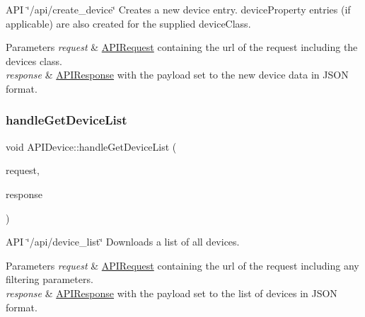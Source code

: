 A\+PI \char`\"{}/api/create\+\_\+device\char`\"{} Creates a new device entry. device\+Property entries (if applicable) are also created for the supplied device\+Class. 
\begin{DoxyParams}{Parameters}
{\em request} & \hyperlink{class_a_p_i_request}{A\+P\+I\+Request} containing the url of the request including the device\textquotesingle{}s class. \\
\hline
{\em response} & \hyperlink{class_a_p_i_response}{A\+P\+I\+Response} with the payload set to the new device data in J\+S\+ON format. \\
\hline
\end{DoxyParams}
\mbox{\label{class_a_p_i_device_a1e74a10d605557654fe5be02a9db87ab}} 
\subsubsection{\texorpdfstring{handle\+Get\+Device\+List}{handleGetDeviceList}}
{\footnotesize\ttfamily void A\+P\+I\+Device\+::handle\+Get\+Device\+List (\begin{DoxyParamCaption}\item[{const \hyperlink{class_a_p_i_request}{A\+P\+I\+Request} \&}]{request,  }\item[{\hyperlink{class_a_p_i_response}{A\+P\+I\+Response} $\ast$}]{response }\end{DoxyParamCaption})\hspace{0.3cm}{\ttfamily [slot]}}

A\+PI \char`\"{}/api/device\+\_\+list\char`\"{} Downloads a list of all devices. 
\begin{DoxyParams}{Parameters}
{\em request} & \hyperlink{class_a_p_i_request}{A\+P\+I\+Request} containing the url of the request including any filtering parameters. \\
\hline
{\em response} & \hyperlink{class_a_p_i_response}{A\+P\+I\+Response} with the payload set to the list of devices in J\+S\+ON format. \\
\hline
\end{DoxyParams}
\mbox{\label{class_a_p_i_device_a5be87488af611d8ef61501a07e4a39d9}} 
